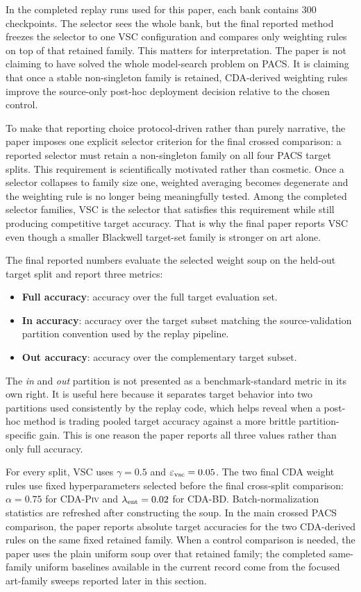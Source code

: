 \documentclass{article}
\theoremstyle{definition}
\newcommand{\eps}{\varepsilon}
\newcommand{\piv}{\textup{\textsc{CDA-Piv}}}
\newcommand{\bd}{\textup{\textsc{CDA-BD}}}
\begin{document}
In the completed replay runs used for this paper, each bank contains 300 checkpoints. The selector sees the whole bank, but the final reported method freezes the selector to one VSC configuration and compares only weighting rules on top of that retained family. This matters for interpretation. The paper is not claiming to have solved the whole model-search problem on PACS. It is claiming that once a stable non-singleton family is retained, CDA-derived weighting rules improve the source-only post-hoc deployment decision relative to the chosen control.

To make that reporting choice protocol-driven rather than purely narrative, the paper imposes one explicit selector criterion for the final crossed comparison: a reported selector must retain a non-singleton family on all four PACS target splits. This requirement is scientifically motivated rather than cosmetic. Once a selector collapses to family size one, weighted averaging becomes degenerate and the weighting rule is no longer being meaningfully tested. Among the completed selector families, VSC is the selector that satisfies this requirement while still producing competitive target accuracy. That is why the final paper reports VSC even though a smaller Blackwell target-set family is stronger on art alone.

The final reported numbers evaluate the selected weight soup on the held-out target split and report three metrics:
\begin{itemize}[leftmargin=1.3em]
    \item \textbf{Full accuracy}: accuracy over the full target evaluation set.
    \item \textbf{In accuracy}: accuracy over the target subset matching the source-validation partition convention used by the replay pipeline.
    \item \textbf{Out accuracy}: accuracy over the complementary target subset.
\end{itemize}
The \emph{in} and \emph{out} partition is not presented as a benchmark-standard metric in its own right. It is useful here because it separates target behavior into two partitions used consistently by the replay code, which helps reveal when a post-hoc method is trading pooled target accuracy against a more brittle partition-specific gain. This is one reason the paper reports all three values rather than only full accuracy.

For every split, VSC uses \(\gamma=0.5\) and \(\eps_{\rm vsc}=0.05\). The two final CDA weight rules use fixed hyperparameters selected before the final cross-split comparison: \(\alpha=0.75\) for \piv{} and \(\lambda_{\rm ent}=0.02\) for \bd{}. Batch-normalization statistics are refreshed after constructing the soup. In the main crossed PACS comparison, the paper reports absolute target accuracies for the two CDA-derived rules on the same fixed retained family. When a control comparison is needed, the paper uses the plain uniform soup over that retained family; the completed same-family uniform baselines available in the current record come from the focused art-family sweeps reported later in this section.
\end{document}
